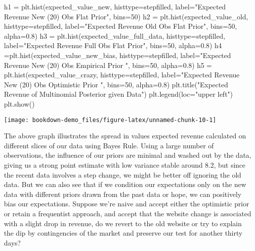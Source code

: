 \documentclass[]{tufte-book}
\newenvironment{Shaded}{}{}
\newcommand{\DecValTok}[1]{\textcolor[rgb]{0.25,0.63,0.44}{#1}}
\newcommand{\FloatTok}[1]{\textcolor[rgb]{0.25,0.63,0.44}{#1}}
\newcommand{\NormalTok}[1]{#1}
\newcommand{\OperatorTok}[1]{\textcolor[rgb]{0.40,0.40,0.40}{#1}}
\newcommand{\StringTok}[1]{\textcolor[rgb]{0.25,0.44,0.63}{#1}}
\theoremstyle{definition}
\theoremstyle{definition}
\theoremstyle{definition}
\theoremstyle{remark}
\begin{document}
\begin{Shaded}
\begin{Highlighting}[]
\NormalTok{h1 }\OperatorTok{=}\NormalTok{ plt.hist(expected\_value\_new, histtype}\OperatorTok{=}\StringTok{\textquotesingle{}stepfilled\textquotesingle{}}\NormalTok{, }
\NormalTok{label}\OperatorTok{=}\StringTok{"Expected Revenue New (20) Obs Flat Prior"}\NormalTok{, bins}\OperatorTok{=}\DecValTok{50}\NormalTok{)}
\NormalTok{h2 }\OperatorTok{=}\NormalTok{ plt.hist(expected\_value\_old, histtype}\OperatorTok{=}\StringTok{\textquotesingle{}stepfilled\textquotesingle{}}\NormalTok{, }
\NormalTok{label}\OperatorTok{=}\StringTok{"Expected Revenue Old Obs Flat Prior"}\NormalTok{, bins}\OperatorTok{=}\DecValTok{50}\NormalTok{, alpha}\OperatorTok{=}\FloatTok{0.8}\NormalTok{)}
\NormalTok{h3 }\OperatorTok{=}\NormalTok{ plt.hist(expected\_value\_full\_data, histtype}\OperatorTok{=}\StringTok{\textquotesingle{}stepfilled\textquotesingle{}}\NormalTok{, }
\NormalTok{label}\OperatorTok{=}\StringTok{"Expected Revenue Full Obs Flat Prior"}\NormalTok{, bins}\OperatorTok{=}\DecValTok{50}\NormalTok{, alpha}\OperatorTok{=}\FloatTok{0.8}\NormalTok{)}
\NormalTok{h4 }\OperatorTok{=}\NormalTok{plt.hist(expected\_value\_new\_bias, histtype}\OperatorTok{=}\StringTok{\textquotesingle{}stepfilled\textquotesingle{}}\NormalTok{, }
\NormalTok{label}\OperatorTok{=}\StringTok{"Expected Revenue New (20) Obs Empirical Prior "}\NormalTok{, bins}\OperatorTok{=}\DecValTok{50}\NormalTok{, alpha}\OperatorTok{=}\FloatTok{0.8}\NormalTok{)}
\NormalTok{h5 }\OperatorTok{=}\NormalTok{ plt.hist(expected\_value\_crazy, histtype}\OperatorTok{=}\StringTok{\textquotesingle{}stepfilled\textquotesingle{}}\NormalTok{, }
\NormalTok{label}\OperatorTok{=}\StringTok{"Expected Revenue New (20) Obs Optimistic Prior "}\NormalTok{, bins}\OperatorTok{=}\DecValTok{50}\NormalTok{, alpha}\OperatorTok{=}\FloatTok{0.8}\NormalTok{)}
\NormalTok{plt.title(}\StringTok{"Expected Revenue of Multinomial Posterior given Data"}\NormalTok{)}
\NormalTok{plt.legend(loc}\OperatorTok{=}\StringTok{"upper left"}\NormalTok{)}
\NormalTok{plt.show()}
\end{Highlighting}
\end{Shaded}

\texttt{[image: bookdown-demo\_files/figure-latex/unnamed-chunk-10-1]}

The above graph illustrates the spread in values expected revenue calculated on different slices of our data using Bayes Rule. Using a large number of observations, the influence of our priors are minimal and washed out by the data, giving us a strong point estimate with low variance stable around 8.2, but since the recent data involves a step change, we might be better off ignoring the old data. But we can also see that if we condition our expectations only on the new data with different priors drawn from the past data or hope, we can positively bias our expectations. Suppose we're naive and accept either the optimistic prior or retain a frequentist approach, and accept that the website change is associated with a slight drop in revenue, do we revert to the old website or try to explain the dip by contingencies of the market and preserve our test for another thirty days?
\end{document}
